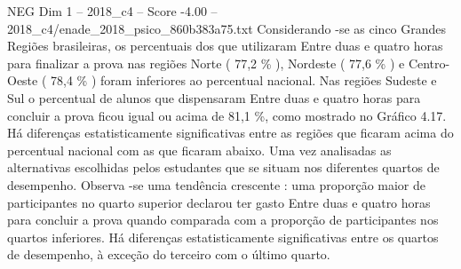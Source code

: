\begin{textsample}{NEG Dim 1 – 2018\_c4 – Score -4.00 – 2018\_c4/enade\_2018\_psico\_860b383a75.txt}
Considerando -se as cinco Grandes Regiões brasileiras, os percentuais dos que utilizaram Entre duas e quatro horas para finalizar a prova nas regiões Norte ( 77,2 \% ), Nordeste ( 77,6 \% ) e Centro-Oeste ( 78,4 \% ) foram inferiores ao percentual nacional.
Nas regiões Sudeste e Sul o percentual de alunos que dispensaram Entre duas e quatro horas para concluir a prova ficou igual ou acima de 81,1 \%, como mostrado no Gráfico 4.17.
Há diferenças estatisticamente significativas entre as regiões que ficaram acima do percentual nacional com as que ficaram abaixo.
Uma vez analisadas as alternativas escolhidas pelos estudantes que se situam nos diferentes quartos de desempenho.
Observa -se uma tendência crescente : uma proporção maior de participantes no quarto superior declarou ter gasto Entre duas e quatro horas para concluir a prova quando comparada com a proporção de participantes nos quartos inferiores.
Há diferenças estatisticamente significativas entre os quartos de desempenho, à exceção do terceiro com o último quarto.

\end{textsample}
